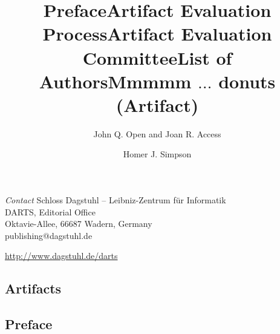 \documentclass[a4paper,UKenglish]{dartsmaster-v2019}
\begin{document}
\begin{publicationinfo}
\bigskip
\emph{Contact}\newline
Schloss Dagstuhl -- Leibniz-Zentrum f\"ur Informatik\\
DARTS, Editorial Office\\
Oktavie-Allee, 66687 Wadern, Germany\\
publishing@dagstuhl.de


\bigskip

\url{http://www.dagstuhl.de/darts}

 \thispagestyle{empty}
 \onecolumn

\newpage

\end{publicationinfo}




\begin{contentslist}

\contitem
\title{Preface}
\author{John Q. Open and Joan R. Access}

\contitem
\title{Artifact Evaluation Process}
\author{ }

\contitem
\title{Artifact Evaluation Committee}
\author{ }

\contitem
\title{List of Authors}
\author{ }

\part{Artifacts}


\contitem
\title{Mmmmm $\ldots$ donuts (Artifact)}
\author{Homer J. Simpson}


\end{contentslist}

\chapter{Preface} %
\end{document}
